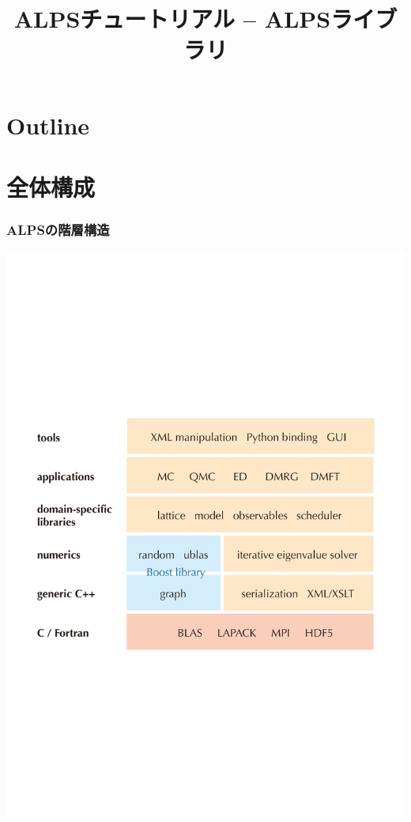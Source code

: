 \title{ALPSチュートリアル -- ALPSライブラリ}




\begin{frame}
  \titlepage
\end{frame}

\section*{Outline}
\begin{frame}
  \tableofcontents
\end{frame}

\section{全体構成}

\begin{frame}
  \frametitle{ALPSの階層構造}
  \begin{center}
    \includegraphics[height=0.65\textheight]{hierarchy.pdf}
  \end{center}
\end{frame}

